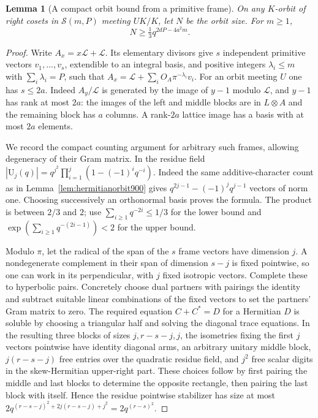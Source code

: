 \documentclass[a4paper,11pt]{article}
\newtheorem{lemma}[proposition]{Lemma}
\theoremstyle{definition}
\theoremstyle{remark}
\numberwithin{equation}{section}
\begin{document}
\begin{lemma}[A compact orbit bound from a primitive frame]
\leavevmode\label{lem:inertframe902}
On any \(K\)-orbit of right cosets in \(\mathcal S(m,P)\)
meeting \(UK/K\), let \(N\) be the orbit size. For \(m\ge1\),
\[
                           N\ge \tfrac13 q^{2dP-4a^2m}.
\]
\end{lemma}
\begin{proof}
Write \(A_x=x\mathcal L+\mathcal L\).
Its elementary divisors give \(s\) independent primitive vectors
\(v_1,\ldots,v_s\), extendible to an integral basis, and positive
integers \(\lambda_i\le m\) with \(\sum_i\lambda_i=P\), such that
\(A_x=\mathcal L+\sum_i O_A\pi^{-\lambda_i}v_i\).
For an orbit meeting \(U\) one has \(s\le2a\).
Indeed \(A_y/\mathcal L\) is generated by the image of \(y-1\)
modulo \(\mathcal L\), and \(y-1\) has rank at most \(2a\):
the images of the left and middle blocks are in \(L\otimes A\)
and the remaining block has \(a\) columns. A rank-\(2a\)
lattice image has a basis with at most \(2a\) elements.

We record the compact counting argument for arbitrary such
frames, allowing degeneracy of their Gram matrix. In the
residue field \(|\mathrm U_j(q)|=q^{j^2}\prod_{i=1}^j
(1-(-1)^i q^{-i})\). Indeed the same additive-character count
as in Lemma~\ref{lem:hermitianorbit900} gives
\(q^{2j-1}-(-1)^j q^{j-1}\) vectors of norm one. Choosing
successively an orthonormal basis proves the formula. The
product is between \(2/3\) and \(2\); use
\(\sum_{i\ge1}q^{-2i}\le1/3\) for the lower bound and
\(\exp(\sum_{i\ge1}q^{-(2i-1)})<2\) for the upper bound.

Modulo \(\pi\), let the radical of the span of the \(s\)
frame vectors have dimension \(j\). A nondegenerate complement
in their span of dimension \(s-j\) is fixed pointwise, so one
can work in its perpendicular, with \(j\) fixed isotropic
vectors. Complete these to hyperbolic pairs. Concretely choose
dual partners with pairings the identity and subtract suitable
linear combinations of the fixed vectors to set the partners'
Gram matrix to zero. The required equation \(C+C^*=D\) for a
Hermitian \(D\) is soluble by choosing a triangular half and
solving the diagonal trace equations. In the resulting three
blocks of sizes \(j,r-s-j,j\), the isometries fixing the first
\(j\) vectors pointwise have identity diagonal arms, an arbitrary
unitary middle block, \(j(r-s-j)\) free entries over the
quadratic residue field, and \(j^2\) free scalar digits in the
skew-Hermitian upper-right part. These choices follow by first
pairing the middle and last blocks to determine the opposite
rectangle, then pairing the last block with itself. Hence the
residue pointwise stabilizer has size at most
\(2q^{(r-s-j)^2+2j(r-s-j)+j^2}=2q^{(r-s)^2}\).


\end{proof}
\end{document}
